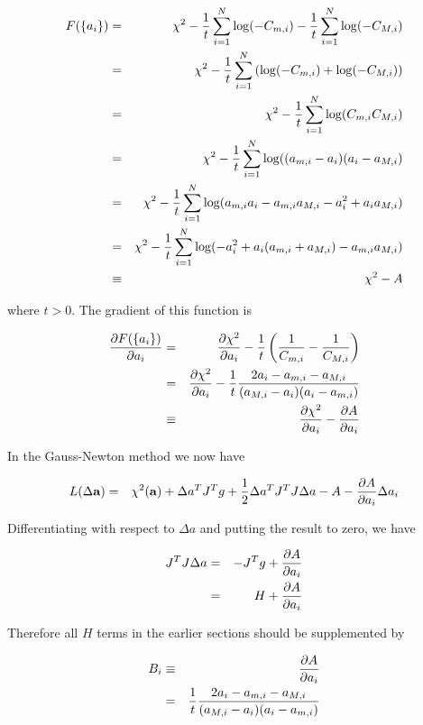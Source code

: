 \documentclass[a4paper,12pt,onecolumn]{article}
\def\a{\mathbf{a}}
\begin{document}
\begin{eqnarray}
F(\{a_i\})
&=& \chi^2
- {1 \over t} \sum_{i=1}^N \log(-C_{m,i})
- {1 \over t} \sum_{i=1}^N \log(-C_{M,i}) \\
&=& \chi^2
- {1 \over t} \sum_{i=1}^N
\left(
\log(-C_{m,i}) + \log(-C_{M,i})
\right) \\
&=& \chi^2
- {1 \over t} \sum_{i=1}^N
\log( C_{m,i} C_{M,i}) \\
&=& \chi^2
- {1 \over t} \sum_{i=1}^N
\log( (a_{m,i} - a_i) (a_i - a_{M,i}) \\
&=& \chi^2
- {1 \over t} \sum_{i=1}^N
\log( a_{m,i} a_i - a_{m,i} a_{M,i}
- a_i^2 + a_i a_{M,i} ) \\
&=& \chi^2
- {1 \over t} \sum_{i=1}^N
\log(
- a_i^2
+ a_i (a_{m,i} + a_{M,i})
- a_{m,i} a_{M,i}
) \\
&\equiv & \chi^2 - A
\end{eqnarray}

where $t > 0$. The gradient of this function is

\begin{eqnarray}
{\partial F(\{a_i\}) \over \partial a_i}
&=&
{\partial \chi^2 \over \partial a_i}
- {1 \over t}
\left(
{1 \over C_{m,i}} - {1 \over C_{M,i}}
\right) \\
&=&
{\partial \chi^2 \over \partial a_i}
- {1 \over t}
{2 a_i - a_{m,i} - a_{M,i} \over
(a_{M,i}-a_i) (a_i-a_{m,i})} \\
&\equiv &
{\partial \chi^2 \over \partial a_i} - {\partial A \over \partial a_i}
\end{eqnarray}


In the Gauss-Newton method we now have

\begin{eqnarray}
L(\Delta \a)
&=&
\chi^2(\a)
+ \Delta a^T J^T g
+ {1 \over 2} \Delta a^T J^T J \Delta a
- A - {\partial A \over \partial a_i} \Delta a_i
\end{eqnarray}

Differentiating with respect to $\Delta a$ and
putting the result to zero, we have

\begin{eqnarray}
J^T J \Delta a
&=&
- J^T g + {\partial A \over \partial a_i} \\
&=&
H + {\partial A \over \partial a_i}
\end{eqnarray}

Therefore all $H$ terms in the earlier sections should be
supplemented by

\begin{eqnarray}
B_i &\equiv & {\partial A \over \partial a_i} \\
&=&
{1 \over t}
{2 a_i - a_{m,i} - a_{M,i} \over
(a_{M,i}-a_i) (a_i-a_{m,i})}
\end{eqnarray}
\end{document}
